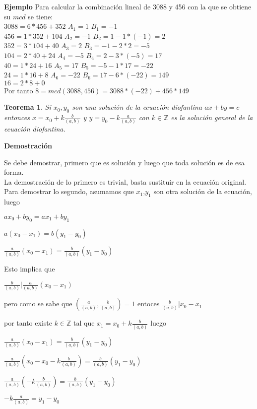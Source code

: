 \documentclass[a4paper,1pt]{report}
\newtheorem*{teo}{Teorema}
\begin{document}
\textbf{Ejemplo}
Para calcular la combinación lineal de 3088 y 456 con la que se obtiene su $mcd$ se tiene:\\
$3088=6*456+352$ $A_1=1$ $B_1=-1$\\
$456=1*352+104$ $A_2=-1$ $B_2=1-1*(-1)=2$\\
$352=3*104+40$ $A_3=2$ $B_3=-1-2*2=-5$\\
$104=2*40+24$ $A_4=-5$ $B_4=2-3*(-5)=17$\\
$40=1*24+16$ $A_5=17$ $B_5=-5-1*17=-22$\\
$24=1*16+8$ $A_6=-22$ $B_6=17-6*(-22)=149$\\
$16=2*8 + 0$\\
Por tanto $8=mcd(3088,456)=3088*(-22)+456*149$

\begin{teo}
 Si $x_0,y_0$ son una solución de la ecuación diofantina $ax+by=c$ entonces 
 $x=x_0+k\frac{b}{(a,b)}$ y $y=y_0-k\frac{a}{(a,b)}$ con $k\in\mathbb{Z}$ es la solución general de la ecuación diofantina.
\end{teo}

\newpage
\textbf{Demostración}

Se debe demostrar, primero que es solución y luego que toda solución es de esa forma.
\\

La demostración de lo primero es trivial, basta sustituir en la ecuación original.
\\

Para demostrar lo segundo, asumamos que $x_1$,$y_1$ son otra solución de la ecuación, luego

$ax_0+by_0=ax_1+by_1$

$a(x_0-x_1)=b(y_1-y_0)$

$\frac{a}{(a,b)}(x_0-x_1)=\frac{b}{(a,b)}(y_1-y_0)$

Esto implica que

$\frac{b}{(a,b)}|\frac{a}{(a,b)}(x_0-x_1)$

pero como se sabe que $(\frac{a}{(a,b)},\frac{b}{(a,b)})=1$ entoces $\frac{b}{(a,b)}|x_0-x_1$

por tanto existe $k\in\mathbb{Z}$ tal que $x_1=x_0 + k\frac{b}{(a,b)}$ luego

$\frac{a}{(a,b)}(x_0-x_1)=\frac{b}{(a,b)}(y_1-y_0)$


$\frac{a}{(a,b)}(x_0- x_0 - k\frac{b}{(a,b)} )=\frac{b}{(a,b)}(y_1-y_0)$

$\frac{a}{(a,b)}(- k\frac{b}{(a,b)} )=\frac{b}{(a,b)}(y_1-y_0)$

$-k\frac{a}{(a,b)}=y_1-y_0$
\end{document}
